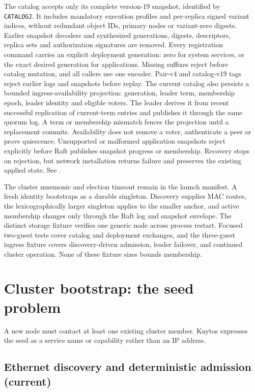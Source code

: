 The catalog accepts only its complete version-19 snapshot, identified by
\texttt{CATALOGJ}. It includes mandatory execution profiles and per-replica signed variant indices,
without redundant object IDs, primary nodes or variant-zero digests. Earlier snapshot decoders and synthesized generations,
digests, descriptors, replica sets and authorization signatures are removed.
Every registration command carries an explicit deployment generation: zero
for system services, or the exact desired generation for applications. Missing
suffixes reject before catalog mutation, and all callers use one encoder. Pair-v4
and catalog-v19 tags reject earlier logs and snapshots before replay.
The current catalog also persists a bounded ingress-availability projection:
generation, leader term, membership epoch, leader identity and eligible voters.
The leader derives it from recent successful replication of current-term
entries and publishes it through the same quorum log. A term or membership
mismatch fences the projection until a replacement commits. Availability
does not remove a voter, authenticate a peer or prove quiescence.
Unsupported or malformed application snapshots reject explicitly before Raft
publishes snapshot progress or membership. Recovery stops on rejection, but
network installation returns failure and preserves the existing applied state.
See .

The cluster mnemonic and election timeout remain in the launch manifest. A
fresh identity bootstraps as a durable singleton. Discovery supplies MAC routes,
the lexicographically larger singleton applies to the smaller anchor, and
active membership changes only through the Raft log and snapshot envelope.
The distinct storage fixture verifies one generic node across process restart.
Focused two-guest tests cover catalog and deployment exchanges, and the
three-guest ingress fixture covers discovery-driven admission, leader failover,
and continued cluster operation. None of these fixture sizes bounds membership.

\section{Cluster bootstrap: the seed problem}

A new node must contact at least one existing cluster member. Knytos
expresses the seed as a service name or capability rather than an IP address.

\subsection{Ethernet discovery and deterministic admission (current)}

